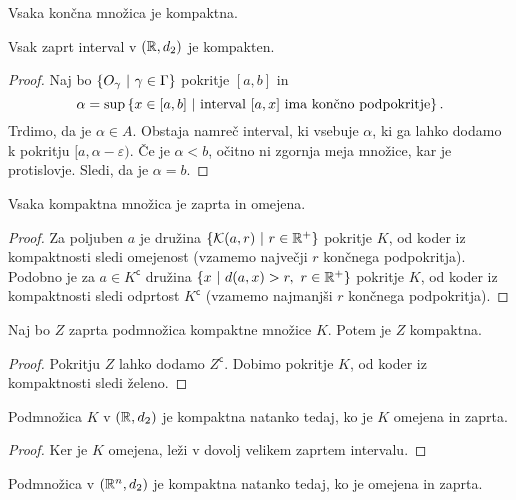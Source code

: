 \documentclass[12pt, a4paper]{article}
\begin{document}
\begin{opomba}
Vsaka končna množica je kompaktna.
\end{opomba}

\begin{trditev}
Vsak zaprt interval v $(\mathbb{R},d_2)$ je kompakten.
\end{trditev}

\begin{proof}
Naj bo $\left\{O_\gamma~\middle\vert~\gamma\in\Gamma\right\}$ pokritje $[a,b]$ in
\[
\alpha=\sup\left\{x\in[a,b]~\middle\vert~\text{interval $[a,x]$ ima končno podpokritje}\right\}.
\]
Trdimo, da je $\alpha\in A$. Obstaja namreč interval, ki vsebuje $\alpha$, ki ga lahko dodamo k pokritju $[a,\alpha-\varepsilon)$. Če je $\alpha<b$, očitno ni zgornja meja množice, kar je protislovje. Sledi, da je $\alpha=b$.
\end{proof}

\begin{trditev}
Vsaka kompaktna množica je zaprta in omejena.
\end{trditev}

\begin{proof}
Za poljuben $a$ je družina $\left\{\mathcal{K}(a,r)~\middle\vert~r\in\mathbb{R}^+\right\}$ pokritje $K$, od koder iz kompaktnosti sledi omejenost (vzamemo največji $r$ končnega podpokritja). Podobno je za $a\in K^\mathsf{c}$ družina $\left\{x~\middle\vert~d(a,x)>r,~r\in\mathbb{R}^+\right\}$ pokritje $K$, od koder iz kompaktnosti sledi odprtost $K^\mathsf{c}$ (vzamemo najmanjši $r$ končnega podpokritja).
\end{proof}

\begin{trditev}
Naj bo $Z$ zaprta podmnožica kompaktne množice $K$. Potem je $Z$ kompaktna.
\end{trditev}

\begin{proof}
Pokritju $Z$ lahko dodamo $Z^\mathsf{c}$. Dobimo pokritje $K$, od koder iz kompaktnosti sledi želeno.
\end{proof}

\begin{posledica}
Podmnožica $K$ v $(\mathbb{R},d_2)$ je kompaktna natanko tedaj, ko je $K$ omejena in zaprta.
\end{posledica}

\begin{proof}
Ker je $K$ omejena, leži v dovolj velikem zaprtem intervalu.
\end{proof}

\begin{izrek}
Podmnožica v $(\mathbb{R}^n,d_2)$ je kompaktna natanko tedaj, ko je omejena in zaprta.
\end{izrek}
\end{document}
